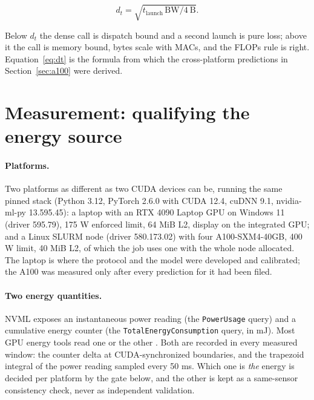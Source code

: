 \documentclass{article}
\begin{document}
\begin{equation}
d_t = \sqrt{t_{\mathrm{launch}}\, \mathrm{BW} / 4\ \mathrm{B}}.
\label{eq:dt}
\end{equation}

Below $d_t$ the dense call is dispatch bound and a second launch is pure loss; above it the call is memory bound, bytes scale with MACs, and the FLOPs rule is right. Equation~\ref{eq:dt} is the formula from which the cross-platform predictions in Section~\ref{sec:a100} were derived.

\section{Measurement: qualifying the energy source}
\label{sec:measurement}

\paragraph{Platforms.} Two platforms as different as two CUDA devices can be, running the same pinned stack (Python 3.12, PyTorch 2.6.0 with CUDA 12.4, cuDNN 9.1, nvidia-ml-py 13.595.45): a laptop with an RTX 4090 Laptop GPU on Windows 11 (driver 595.79), 175 W enforced limit, 64 MiB L2, display on the integrated GPU; and a Linux SLURM node (driver 580.173.02) with four A100-SXM4-40GB, 400 W limit, 40 MiB L2, of which the job uses one with the whole node allocated. The laptop is where the protocol and the model were developed and calibrated; the A100 was measured only after every prediction for it had been filed.

\paragraph{Two energy quantities.} NVML exposes an instantaneous power reading (the \texttt{PowerUsage} query) and a cumulative energy counter (the \texttt{TotalEnergyConsumption} query, in mJ). Most GPU energy tools read one or the other \cite{you2023zeus,anthony2020carbontracker,lacoste2019quantifying}. Both are recorded in every measured window: the counter delta at CUDA-synchronized boundaries, and the trapezoid integral of the power reading sampled every 50 ms. Which one is \emph{the} energy is decided per platform by the gate below, and the other is kept as a same-sensor consistency check, never as independent validation.
\end{document}
